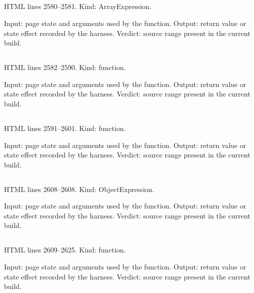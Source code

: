 \subsection*{\texttt{}}
\label{vf_70_RESULT_PROPS}
HTML lines 2580--2581. Kind: ArrayExpression.

Input: page state and arguments used by the function.
Output: return value or state effect recorded by the harness.
Verdict: source range present in the current build.

\subsection*{\texttt{}}
\label{vf_71_readLists}
HTML lines 2582--2590. Kind: function.

Input: page state and arguments used by the function.
Output: return value or state effect recorded by the harness.
Verdict: source range present in the current build.

\subsection*{\texttt{}}
\label{vf_72_resultKindOf}
HTML lines 2591--2601. Kind: function.

Input: page state and arguments used by the function.
Output: return value or state effect recorded by the harness.
Verdict: source range present in the current build.

\subsection*{\texttt{}}
\label{vf_73_PAIRING_RULES}
HTML lines 2608--2608. Kind: ObjectExpression.

Input: page state and arguments used by the function.
Output: return value or state effect recorded by the harness.
Verdict: source range present in the current build.

\subsection*{\texttt{}}
\label{vf_74_rqResult}
HTML lines 2609--2625. Kind: function.

Input: page state and arguments used by the function.
Output: return value or state effect recorded by the harness.
Verdict: source range present in the current build.

